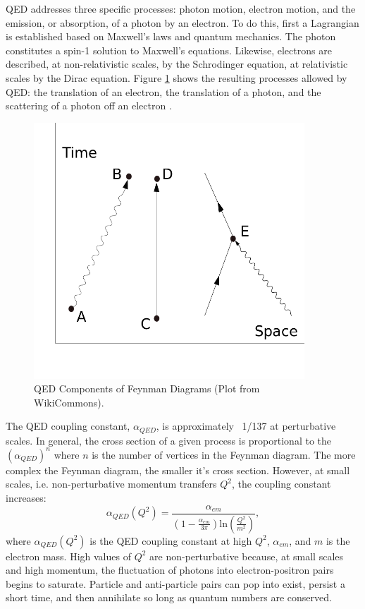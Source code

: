 QED addresses three specific processes: photon motion, electron motion, and the emission, or absorption, of a photon by an electron. To do this, first a Lagrangian is established based on Maxwell's laws and quantum mechanics. The photon constitutes a spin-1 solution to Maxwell's equations. Likewise, electrons are described, at non-relativistic scales, by the Schrodinger equation, at relativistic scales by the Dirac equation. Figure \ref{fig:qedFeynman} shows the resulting processes allowed by QED: the translation of an electron, the translation of a photon, and the scattering of a photon off an electron \cite{Griffiths:2008zz}. \setlength\abovedisplayskip{0.4pt}
\setlength\belowdisplayskip{0.4pt}

\begin{figure}[h!]
\begin{centering}
\includegraphics[width=4in]{Chapter1/importfigs/Feynman_Diagram_Components.png}
\par\end{centering}
\caption{QED Components of Feynman Diagrams (Plot from WikiCommons). \label{fig:qedFeynman}}
\end{figure}

The QED coupling constant, $\alpha_{QED}$, is approximately ~1/137 at perturbative scales. In general, the cross section of a given process is proportional to the $(\alpha_{QED})^n$ where $n$ is the number of vertices in the Feynman diagram. The more complex the Feynman diagram, the smaller it's cross section. However, at small scales, i.e. non-perturbative momentum transfers $Q^2$, the coupling constant increases:
\begin{equation}
\alpha_{QED}(Q^2) = \frac{ \alpha_{em}}{(1 - \frac{\alpha_{em}}{3\pi})\mathrm{ln}(\frac{Q^2}{m^2}) },
\end{equation}
where $\alpha_{QED}(Q^2)$ is the QED coupling constant at high $Q^2$, $\alpha_{em}$, and $m$ is the electron mass. High values of $Q^2$ are non-perturbative because, at small scales and high momentum, the fluctuation of photons into electron-positron pairs begins to saturate. Particle and anti-particle pairs can pop into exist, persist a short time, and then annihilate so long as quantum numbers are conserved. 

